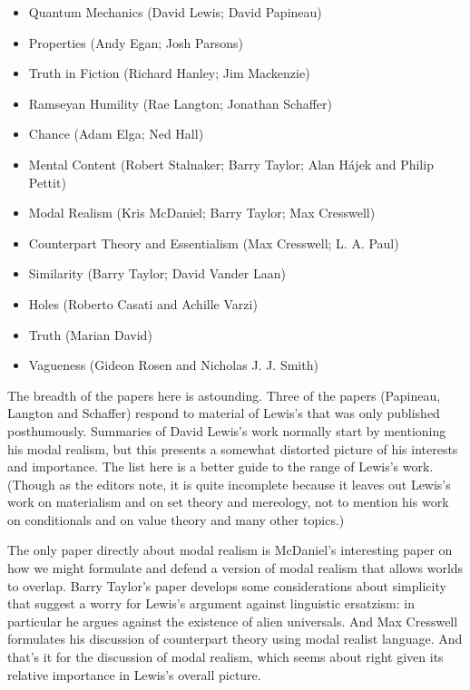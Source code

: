 \documentclass[
  11pt,
  letterpaper,
  DIV=11,
  numbers=noendperiod,
  twoside]{scrartcl}
\providecommand{\tightlist}{%
  \setlength{\itemsep}{0pt}\setlength{\parskip}{0pt}}
\begin{document}
\begin{itemize}
\tightlist
\item
  Quantum Mechanics (David Lewis; David Papineau)
\item
  Properties (Andy Egan; Josh Parsons)
\item
  Truth in Fiction (Richard Hanley; Jim Mackenzie)
\item
  Ramseyan Humility (Rae Langton; Jonathan Schaffer)
\item
  Chance (Adam Elga; Ned Hall)
\item
  Mental Content (Robert Stalnaker; Barry Taylor; Alan Hájek and Philip
  Pettit)
\item
  Modal Realism (Kris McDaniel; Barry Taylor; Max Cresswell)
\item
  Counterpart Theory and Essentialism (Max Cresswell; L. A. Paul)
\item
  Similarity (Barry Taylor; David Vander Laan)
\item
  Holes (Roberto Casati and Achille Varzi)
\item
  Truth (Marian David)
\item
  Vagueness (Gideon Rosen and Nicholas J. J. Smith)
\end{itemize}

The breadth of the papers here is astounding. Three of the papers
(Papineau, Langton and Schaffer) respond to material of Lewis's that was
only published posthumously. Summaries of David Lewis's work normally
start by mentioning his modal realism, but this presents a somewhat
distorted picture of his interests and importance. The list here is a
better guide to the range of Lewis's work. (Though as the editors note,
it is quite incomplete because it leaves out Lewis's work on materialism
and on set theory and mereology, not to mention his work on conditionals
and on value theory and many other topics.)

The only paper directly about modal realism is McDaniel's interesting
paper on how we might formulate and defend a version of modal realism
that allows worlds to overlap. Barry Taylor's paper develops some
considerations about simplicity that suggest a worry for Lewis's
argument against linguistic ersatzism: in particular he argues against
the existence of alien universals. And Max Cresswell formulates his
discussion of counterpart theory using modal realist language. And
that's it for the discussion of modal realism, which seems about right
given its relative importance in Lewis's overall picture.
\end{document}
